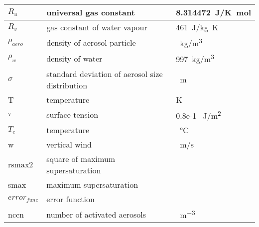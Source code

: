 \begin{table}[h]
\begin{tabular}{|l|l|l|}
		$R_u$           & universal gas constant                             & \SI{8.314472}{J/K mol}   \\ \hline
		$R_v$           & gas constant of water vapour                       & \SI{461}{J/kg K}         \\ \hline
		$\rho_{aero}$   & density of aerosol particle                        & \SI{}{kg/m^{3}}          \\ \hline
		$\rho_w$        & density of water                                   & \SI{997}{kg/m^{3}}       \\ \hline
		$\sigma$        & standard deviation of aerosol size distribution    & \SI{}{m}                 \\ \hline			
		T               & temperature                                        & K                        \\ \hline
		$\tau$          & surface tension                                    & 0.8e-1 \SI{}{J/m^{2}}     \\ \hline
		$T_c$           & temperature                                        & \SI{}{\degreeCelsius}    \\ \hline
		w               & vertical wind                                      & \SI{}{m/s}               \\ \hline
		rsmax2			& square of maximum supersaturation					 & 							\\ \hline
		smax			& maximum supersaturation							 &							\\ \hline
		$error_{func}$	& error function									 &							\\ \hline
		nccn			& number of activated aerosols						 & \SI{}{m^{-3}}			\\ \hline
	\end{tabular}
\end{table}